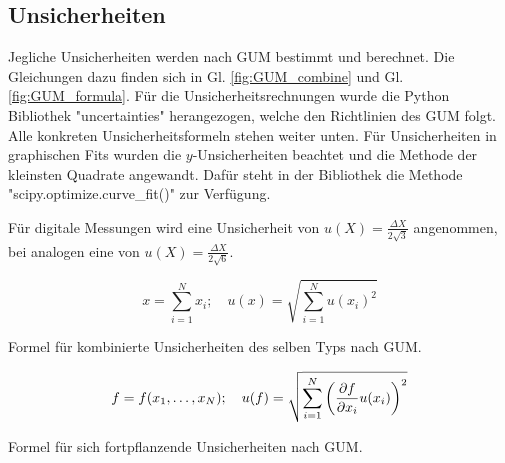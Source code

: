 \subsection{Unsicherheiten}\label{subsec:unc}

	Jegliche Unsicherheiten werden nach GUM bestimmt und berechnet.
	Die Gleichungen dazu finden sich in Gl. \ref{fig:GUM_combine} und Gl. \ref{fig:GUM_formula}.
	Für die Unsicherheitsrechnungen wurde die Python Bibliothek "uncertainties" herangezogen, welche den Richtlinien des GUM folgt.
	Alle konkreten Unsicherheitsformeln stehen weiter unten.
	Für Unsicherheiten in graphischen Fits wurden die $y$-Unsicherheiten beachtet und die Methode der kleinsten Quadrate angewandt.
	Dafür steht in der Bibliothek die Methode "scipy.optimize.curve\_fit()" zur Verfügung.
	
	Für digitale Messungen wird eine Unsicherheit von $u(X) = \frac{\Delta X}{2\sqrt{3}}$ angenommen, bei analogen eine von $u(X) = \frac{\Delta X}{2\sqrt{6}}$.
	
	\vspace{1,5cm}	
	\begin{equation} \label{fig:GUM_combine}	
		x = \sum_{i=1}^{N} x_i
		;\quad
		u(x) = \sqrt{\sum_{i = 1}^{N} u(x_i)^2}		
	\end{equation}
	\begin{center}
		{Formel für kombinierte Unsicherheiten des selben Typs nach GUM.}
	\end{center}
			
	\begin{align} \label{fig:GUM_formula}
		f = f(x_1, \dots , x_N)
		;\quad
		u(f) = \sqrt{\sum_{i = 1}^{N}\left(\pdv{f}{x_i} u(x_i)\right) ^2}
	\end{align}
	\begin{center}
		{Formel für sich fortpflanzende Unsicherheiten nach GUM.}	
	\end{center}
	

